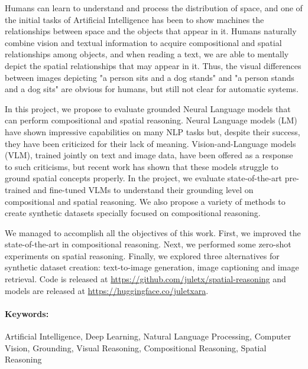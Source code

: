 Humans can learn to understand and process the distribution of space, and one of the initial tasks of Artificial Intelligence has been to show machines the relationships between space and the objects that appear in it. Humans naturally combine vision and textual information to acquire compositional and spatial relationships among objects, and when reading a text, we are able to mentally depict the spatial relationships that may appear in it. Thus, the visual differences between images depicting "a person sits and a dog stands" and "a person stands and a dog sits" are obvious for humans, but still not clear for automatic systems. 

In this project, we propose to evaluate grounded Neural Language models that can perform compositional and spatial reasoning. Neural Language models (LM) have shown impressive capabilities on many NLP tasks but, despite their success, they have been criticized for their lack of meaning. Vision-and-Language models (VLM), trained jointly on text and image data, have been offered as a response to such criticisms, but recent work has shown that these models struggle to ground spatial concepts properly. In the project, we evaluate state-of-the-art pre-trained and fine-tuned VLMs to understand their grounding level on compositional and spatial reasoning. We also propose a variety of methods to create synthetic datasets specially focused on compositional reasoning.

We managed to accomplish all the objectives of this work. First, we improved the state-of-the-art in compositional reasoning. Next, we performed some zero-shot experiments on spatial reasoning. Finally, we explored three alternatives for synthetic dataset creation: text-to-image generation, image captioning and image retrieval. Code is released at \url{https://github.com/juletx/spatial-reasoning} and models are released at \url{https://huggingface.co/juletxara}.

\paragraph{Keywords:} Artificial Intelligence, Deep Learning, Natural Language Processing, Computer Vision, Grounding, Visual Reasoning, Compositional Reasoning, Spatial Reasoning
